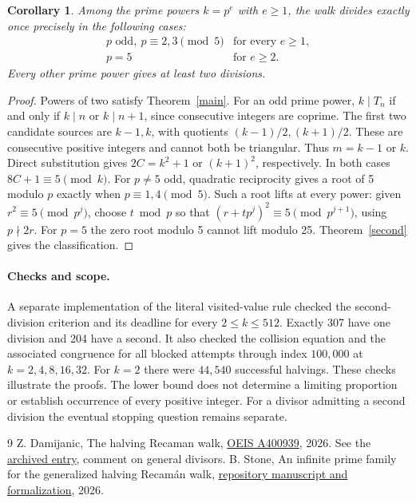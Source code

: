\documentclass[10pt]{article}
\newtheorem{corollary}[theorem]{Corollary}
\begin{document}
\begin{corollary}
Among the prime powers $k=p^e$ with $e\ge1$, the walk divides exactly once precisely in the following cases:
\[
 \begin{array}{ll}
 p\text{ odd},\ p\equiv 2,3\pmod5 &\text{for every }e\ge1,\\
 p=5 &\text{for }e\ge2.
 \end{array}
\]
Every other prime power gives at least two divisions.
\end{corollary}
\begin{proof}
Powers of two satisfy Theorem~\ref{main}. For an odd prime power, $k\mid T_n$ if and only if $k\mid n$ or $k\mid n+1$, since consecutive integers are coprime. The first two candidate sources are $k-1,k$, with quotients $(k-1)/2,(k+1)/2$. These are consecutive positive integers and cannot both be triangular. Thus $m=k-1$ or $k$. Direct substitution gives $2C=k^2+1$ or $(k+1)^2$, respectively. In both cases $8C+1\equiv5\pmod k$.
For $p\ne5$ odd, quadratic reciprocity gives a root of 5 modulo $p$ exactly when $p\equiv1,4\pmod5$. Such a root lifts at every power: given $r^2\equiv5\pmod{p^j}$, choose $t\bmod p$ so that $(r+tp^j)^2\equiv5\pmod{p^{j+1}}$, using $p\nmid2r$. For $p=5$ the zero root modulo 5 cannot lift modulo 25. Theorem~\ref{second} gives the classification.
\end{proof}

\paragraph{Checks and scope.}
A separate implementation of the literal visited-value rule checked the second-division criterion and its deadline for every $2\le k\le512$. Exactly 307 have one division and 204 have a second. It also checked the collision equation and the associated congruence for all blocked attempts through index $100{,}000$ at $k=2,4,8,16,32$. For $k=2$ there were $44{,}540$ successful halvings. These checks illustrate the proofs. The lower bound does not determine a limiting proportion or establish occurrence of every positive integer. For a divisor admitting a second division the eventual stopping question remains separate.

\begin{thebibliography}{9}
 Z. Damijanic, The halving Recaman walk, \href{https://oeis.org/A400939}{OEIS A400939}, 2026. See the \href{https://github.com/oeis/oeisdata/blob/df38d77b83a78d8ab5aaa501dec6e3a3db977f01/seq/A400/A400939.seq}{archived entry}, comment on general divisors.
 B. Stone, An infinite prime family for the generalized halving Recam\'an walk, \href{https://github.com/blakestone-x/math/blob/888d3b3f258bbc442c941a2c444bd8c0100a6963/A400939/README.md}{repository manuscript and formalization}, 2026.
\end{thebibliography}
\end{document}
